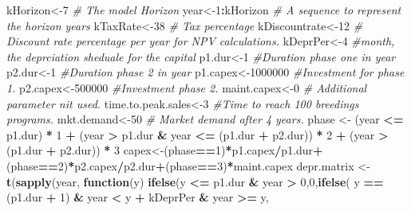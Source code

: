 \documentclass[
]{article}
\newenvironment{Shaded}{\begin{snugshade}}{\end{snugshade}}
\newcommand{\CommentTok}[1]{\textcolor[rgb]{0.56,0.35,0.01}{\textit{#1}}}
\newcommand{\ControlFlowTok}[1]{\textcolor[rgb]{0.13,0.29,0.53}{\textbf{#1}}}
\newcommand{\DecValTok}[1]{\textcolor[rgb]{0.00,0.00,0.81}{#1}}
\newcommand{\KeywordTok}[1]{\textcolor[rgb]{0.13,0.29,0.53}{\textbf{#1}}}
\newcommand{\NormalTok}[1]{#1}
\newcommand{\OperatorTok}[1]{\textcolor[rgb]{0.81,0.36,0.00}{\textbf{#1}}}
\newcommand{\StringTok}[1]{\textcolor[rgb]{0.31,0.60,0.02}{#1}}
\begin{document}
\begin{Shaded}
\begin{Highlighting}[]
\NormalTok{kHorizon<-}\DecValTok{7} \CommentTok{# The model Horizon}
\NormalTok{year<-}\DecValTok{1}\OperatorTok{:}\NormalTok{kHorizon }\CommentTok{# A sequence to represent the horizon years}
\NormalTok{kTaxRate<-}\DecValTok{38} \CommentTok{# Tax percentage}
\NormalTok{kDiscountrate<-}\DecValTok{12} \CommentTok{# Discount rate percentage per year for NPV calculations.}
\NormalTok{kDeprPer<-}\DecValTok{4} \CommentTok{#month, the deprciation sheduale for the capital}
\NormalTok{p1.dur<-}\DecValTok{1} \CommentTok{#Duration phase one in year}
\NormalTok{p2.dur<-}\DecValTok{1} \CommentTok{#Duration phase 2 in year}
\NormalTok{p1.capex<-}\DecValTok{1000000} \CommentTok{#Investment for phase 1.}
\NormalTok{p2.capex<-}\DecValTok{500000} \CommentTok{#Investment phase 2.}
\NormalTok{maint.capex<-}\DecValTok{0} \CommentTok{# Additional parameter nit used.}
\NormalTok{time.to.peak.sales<-}\DecValTok{3} \CommentTok{#Time to reach 100 breedings programs.}
\NormalTok{mkt.demand<-}\DecValTok{50} \CommentTok{# Market demand after 4 years.}
\NormalTok{phase <-}\StringTok{ }\NormalTok{(year }\OperatorTok{<=}\StringTok{ }\NormalTok{p1.dur) }\OperatorTok{*}\StringTok{ }\DecValTok{1} \OperatorTok{+}
\NormalTok{(year }\OperatorTok{>}\StringTok{ }\NormalTok{p1.dur }\OperatorTok{&}\StringTok{ }\NormalTok{year }\OperatorTok{<=}\StringTok{ }\NormalTok{(p1.dur }\OperatorTok{+}\StringTok{ }\NormalTok{p2.dur)) }\OperatorTok{*}\StringTok{ }\DecValTok{2} \OperatorTok{+}
\NormalTok{(year }\OperatorTok{>}\StringTok{ }\NormalTok{(p1.dur }\OperatorTok{+}\StringTok{ }\NormalTok{p2.dur)) }\OperatorTok{*}\StringTok{ }\DecValTok{3}
\NormalTok{capex<-(phase}\OperatorTok{==}\DecValTok{1}\NormalTok{)}\OperatorTok{*}\NormalTok{p1.capex}\OperatorTok{/}\NormalTok{p1.dur}\OperatorTok{+}\NormalTok{(phase}\OperatorTok{==}\DecValTok{2}\NormalTok{)}\OperatorTok{*}\NormalTok{p2.capex}\OperatorTok{/}\NormalTok{p2.dur}\OperatorTok{+}\NormalTok{(phase}\OperatorTok{==}\DecValTok{3}\NormalTok{)}\OperatorTok{*}\NormalTok{maint.capex}
\NormalTok{depr.matrix <-}
\KeywordTok{t}\NormalTok{(}\KeywordTok{sapply}\NormalTok{(year, }\ControlFlowTok{function}\NormalTok{(y)}
\KeywordTok{ifelse}\NormalTok{(y }\OperatorTok{<=}\StringTok{ }\NormalTok{p1.dur }\OperatorTok{&}\StringTok{ }\NormalTok{year }\OperatorTok{>}\StringTok{ }\DecValTok{0}\NormalTok{,}\DecValTok{0}\NormalTok{,}\KeywordTok{ifelse}\NormalTok{(}
\NormalTok{y }\OperatorTok{==}\StringTok{ }\NormalTok{(p1.dur }\OperatorTok{+}\StringTok{ }\DecValTok{1}\NormalTok{) }\OperatorTok{&}\StringTok{ }\NormalTok{year }\OperatorTok{<}\StringTok{ }\NormalTok{y }\OperatorTok{+}\StringTok{ }\NormalTok{kDeprPer }\OperatorTok{&}\StringTok{ }\NormalTok{year }\OperatorTok{>=}\StringTok{ }\NormalTok{y,}

\end{Highlighting}
\end{Shaded}
\end{document}

